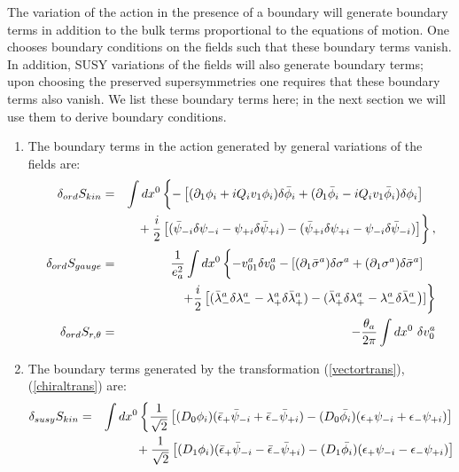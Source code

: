 \documentclass[a4paper,12pt]{article}
\begin{document}
The variation of the action in the presence of a
boundary will generate boundary terms in addition
to the bulk terms proportional to the equations of motion.
One chooses boundary conditions on the fields such that
these boundary terms vanish. 
In addition, SUSY variations of the fields will
also generate boundary terms;
upon choosing the preserved supersymmetries one requires
that these boundary terms also vanish.  We list these
boundary terms here; in the next section we
will use them to derive boundary conditions.
\begin{enumerate}
\item
The boundary terms in the action
generated by general variations
of the fields are:
\begin{eqnarray}
\delta_{ord} S_{kin}&=&\int dx^0\left\{
 -\left[ (\partial_1 \phi_i + iQ_iv_1 \phi_i) \delta
\bar{\phi}_i+(\partial_1 \bar{\phi}_i - iQ_iv_1 \bar{\phi}_i) \delta \phi_i
\right] \phantom{{1\over2}}\right. \nonumber \\
& & \left.\mbox {} +{i \over 2}\left[(\bar{\psi}_{-i}\delta\psi_{-i}-\psi_{+i} 
\delta \bar{\psi}_{+i})-(\bar{\psi}_{+i}\delta\psi_{+i}-\psi_{-i}\delta
\bar{\psi}_{-i}) \right]\right\}, \nonumber \\
\delta_{ord} S_{gauge}&=&{1 \over e_a^2}\int dx^0 \left\{-v_{01}^a\delta v_0^a
-\left[(\partial_1 
\bar{\sigma}^a)\delta\sigma^a+(\partial_1\sigma^a)\delta \bar{\sigma}^a 
\right]\phantom{{1\over2}}\right.\nonumber \\ 
& & \mbox{} \left.+{i \over 2} \left[ (\bar{\lambda}_-^a\delta
\lambda_-^a -\lambda_+^a\delta\bar{\lambda}_+^a)-(
\bar{\lambda}_+^a\delta\lambda_+^a-\lambda_-^a\delta \bar{\lambda}_-^a
\right)] \right\}\nonumber \\
\delta_{ord} S_{r, \theta}&=&-{\theta_a\over 2\pi}\int dx^0 ~\delta v_0^a
\label{eighteen}
\end{eqnarray}
\item
The boundary terms generated by the transformation
(\ref{vectortrans}),(\ref{chiraltrans}) are:
\begin{eqnarray}
\delta_{susy} S_{kin}&=&\int dx^0 \left\{ {1\over\sqrt{2}} \left[ 
(D_0 \phi_i)(\bar{\epsilon}_+ \bar{\psi}_{-i}+\bar{\epsilon}_-
\bar{\psi}_{+i})-(D_0
\bar{\phi_i})(\epsilon_+ \psi_{-i}+\epsilon_-\psi_{+i})\right]\right.
\nonumber \\
& & \mbox{}+{1 \over \sqrt{2}}\left[(D_1\phi_i)(\bar{\epsilon}_+
\bar{\psi}_{-i}-\bar{\epsilon}_-\bar{\psi}_{+i}) -
(D_1 \bar{\phi_i})(\epsilon_+\psi_{-i}-\epsilon_-
\psi_{+i})\right]\nonumber \\

\end{eqnarray}
\end{enumerate}
\end{document}
